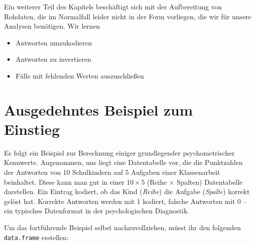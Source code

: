 \documentclass[12pt,]{tufte-book}
\providecommand{\tightlist}{%
  \setlength{\itemsep}{0pt}\setlength{\parskip}{0pt}}
\theoremstyle{definition}
\theoremstyle{definition}
\theoremstyle{definition}
\theoremstyle{remark}
\begin{document}
Ein weiterer Teil des Kapitels beschäftigt sich mit der Aufbereitung von
Rohdaten, die im Normalfall leider nicht in der Form vorliegen, die wir
für unsere Analysen benötigen. Wir lernen

\begin{itemize}
\tightlist
\item
  Antworten umzukodieren
\item
  Antworten zu invertieren
\item
  Fälle mit fehlenden Werten auszuschließen
\end{itemize}

\hypertarget{kap4einstieg}{\section{Ausgedehntes Beispiel zum
Einstieg}\label{kap4einstieg}}

Es folgt ein Beispiel zur Berechnung einiger grundlegender
psychometrischer Kennwerte. Angenommen, uns liegt eine Datentabelle vor,
die die Punktzahlen der Antworten von 10 Schulkindern auf 5 Aufgaben
einer Klassenarbeit beinhaltet. Diese kann man gut in einer
\(10 \times 5\) (Reihe \(\times\) Spalten) Datentabelle darstellen. Ein
Eintrag kodiert, ob das Kind (\emph{Reihe}) die Aufgabe (\emph{Spalte})
korrekt gelöst hat. Korrekte Antworten werden mit 1 kodiert, falsche
Antworten mit 0 -- ein typisches Datenformat in der psychologischen
Diagnostik.

Um das fortführende Beispiel selbst nachzuvollziehen, müsst ihr den
folgenden \texttt{data.frame} erstellen:
\end{document}
